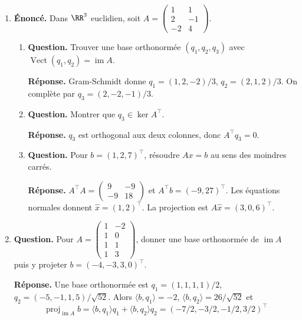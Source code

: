 \documentclass[12pt, a4paper]{article}
\begin{document}
\begin{enumerate}[label=8.\arabic*., start=70]
  \item \begin{minipage}[t]{\linewidth}\raggedright
\textbf{Énoncé.} Dans $\RR^3$ euclidien, soit $A=\begin{pmatrix}1&1\\2&-1\\-2&4\end{pmatrix}$.

\begin{enumerate}[\arabic*.]
        \item \textbf{Question.} Trouver une base orthonormée $(q_1,q_2,q_3)$ avec $\operatorname{Vect}(q_1,q_2)=\operatorname{im}A$.
\par\smallskip
\textbf{Réponse.} Gram-Schmidt donne $q_1=(1,2,-2)/3$, $q_2=(2,1,2)/3$.
        On complète par $q_3=(2,-2,-1)/3$.

  \item \textbf{Question.} Montrer que $q_3\in\ker A^\top$.
\par\smallskip
\textbf{Réponse.} $q_3$ est orthogonal aux deux colonnes, donc $A^\top q_3=0$.

  \item \textbf{Question.} Pour $b=(1,2,7)^\top$, résoudre $Ax=b$ au sens des moindres carrés.
\par\smallskip
\textbf{Réponse.} $A^\top A=\begin{pmatrix}9&-9\\-9&18\end{pmatrix}$ et $A^\top b=(-9,27)^\top$.
        Les équations normales donnent $\widehat x=(1,2)^\top$.
        La projection est $A\widehat x=(3,0,6)^\top$.

\end{enumerate}
\end{minipage}

  \item \begin{minipage}[t]{\linewidth}\raggedright
\textbf{Question.} Pour $A=\begin{pmatrix}1&-2\\1&0\\1&1\\1&3\end{pmatrix}$, donner une base orthonormée de $\operatorname{im}A$ puis y projeter $b=(-4,-3,3,0)^\top$.
\par\smallskip
\textbf{Réponse.} Une base orthonormée est $q_1=(1,1,1,1)/2$, $q_2=(-5,-1,1,5)/\sqrt{52}$.
    Alors $\langle b,q_1\rangle=-2$, $\langle b,q_2\rangle=26/\sqrt{52}$ et
    \[
      \operatorname{proj}_{\operatorname{im}A}b
      =\langle b,q_1\rangle q_1+\langle b,q_2\rangle q_2
      =(-7/2,-3/2,-1/2,3/2)^\top
    \]
\end{minipage}


\end{enumerate}
\end{document}
